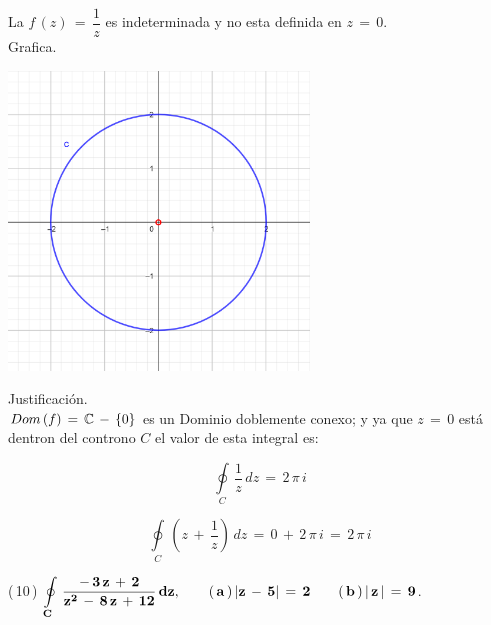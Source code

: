 \documentclass[a4paper,11pt,openany]{book}
\begin{document}
\newpage

\begin{tcolorbox}[colback=ao(english)!5!white,colframe=ao(english)!75!black,fonttitle=\bfseries,title=\sf $I_{2}$]

La $f\,(z)\,=\,\dfrac{1}{z}$ es indeterminada y no esta definida en $z\,=\,0$.\\

\textcolor{ao(english)}{} Grafica.

\begin{center}
     \includegraphics[width=8cm]{Gra-Ej-9-2.png}
\end{center}

\textcolor{ao(english)}{} Justificación.\\

$\mathnormal{Dom\,(f)}\,=\,\mathbb C\,-\,\{0\}$ es un Dominio doblemente conexo; y ya que $z\,=\,0$ está dentron del controno $C$ el valor de esta integral es:

$$\displaystyle\oint\limits_{C}\,\dfrac{1}{z}\,dz\,=\,2\,\pi\,i$$

\end{tcolorbox}

$$\displaystyle\oint\limits_{C}\,(z\,+\,\dfrac{1}{z})\,dz\,=\,0\,+\,2\,\pi\,i\,=\,2\,\pi\,i$$

\textcolor{ao(english)}{(\,10\,)} $\bf{\displaystyle\oint\limits_{C}\,\dfrac{-\,3\,z\,+\,2}{z^{2}\,-\,8\,z\,+\,12}\,dz}, \qquad (\,a\,)\,|z\,-\,5|\,=\,2 \qquad (\,b\,)\,|\,z\,|\,=\,9$.
\end{document}
